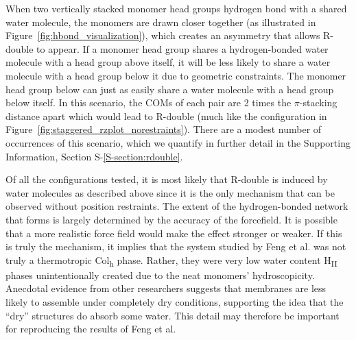 \documentclass[journal=jpcbfk,manuscript=article]{achemso}
\begin{document}
  When two vertically stacked monomer head groups hydrogen bond with a shared
  water molecule, the monomers are drawn closer together (as illustrated in
  Figure~\ref{fig:hbond_visualization}), which creates an asymmetry that allows
  R-double to appear. If a monomer head group shares a hydrogen-bonded water
  molecule with a head group above itself, it will be less likely to share a
  water molecule with a head group below it due to geometric constraints. The
  monomer head group below can just as easily share a water molecule with a head
  group below itself. In this scenario, the COMs of each pair are 2 times the
  $\pi$-stacking distance apart which would lead to R-double (much like the
  configuration in Figure~\ref{fig:staggered_rzplot_norestraints}). There are a
  modest number of occurrences of this scenario, which we quantify in further
  detail in the Supporting Information, Section S-\ref{S-section:rdouble}.  

  
  Of all the configurations tested, it is most likely that R-double is induced
  by water molecules as described above since it is the only mechanism that can
  be observed without position restraints. The extent of the hydrogen-bonded
  network that forms is largely determined by the accuracy of the forcefield. It
  is possible that a more realistic force field would make the effect stronger or
  weaker. If this is truly the mechanism, it implies that the system studied by
  Feng et al.\cite{feng_scalable_2014,feng_thin_2016} was not truly a
  thermotropic Col\textsubscript{h} phase. Rather, they were very low water
  content H\textsubscript{II} phases unintentionally created due to the neat
  monomers' hydroscopicity.  Anecdotal evidence from other researchers suggests
  that membranes are less likely to assemble under completely dry
  conditions, supporting the idea %
  that the ``dry'' structures do absorb some water. This detail may therefore be
  important for reproducing the results of Feng et al.
\end{document}
